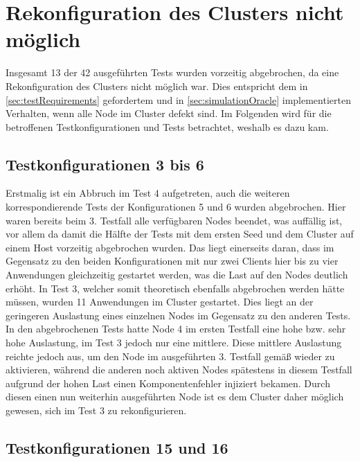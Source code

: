 \section{Rekonfiguration des Clusters nicht möglich}
\label{sec:noReconfig}

Insgesamt 13 der 42 ausgeführten Tests wurden vorzeitig abgebrochen, da eine Rekonfiguration des Clusters nicht möglich war.
Dies entspricht dem in \autoref{sec:testRequirements} gefordertem und in \autoref{sec:simulationOracle} implementierten Verhalten, wenn alle Node im Cluster defekt sind.
Im Folgenden wird für die betroffenen Testkonfigurationen und Tests betrachtet, weshalb es dazu kam.

\subsection{Testkonfigurationen 3 bis 6}
\label{sec:noReconf36}

Erstmalig ist ein Abbruch im Test 4 aufgetreten, auch die weiteren korrespondierende Tests der Konfigurationen 5 und 6 wurden abgebrochen.
Hier waren bereits beim 3. Testfall alle verfügbaren Nodes beendet, was auffällig ist, vor allem da damit die Hälfte der Tests mit dem ersten Seed und dem Cluster auf einem Host vorzeitig abgebrochen wurden.
Das liegt einerseits daran, dass im Gegensatz zu den beiden Konfigurationen mit nur zwei Clients hier bis zu vier Anwendungen gleichzeitig gestartet werden, was die Last auf den Nodes deutlich erhöht.
In Test 3, welcher somit theoretisch ebenfalls abgebrochen werden hätte müssen, wurden 11 Anwendungen im Cluster gestartet.
Dies liegt an der geringeren Auslastung eines einzelnen Nodes im Gegensatz zu den anderen Tests.
In den abgebrochenen Tests hatte Node 4 im ersten Testfall eine hohe bzw. sehr hohe Auslastung, im Test 3 jedoch nur eine mittlere.
Diese mittlere Auslastung reichte jedoch aus, um den Node im ausgeführten 3. Testfall gemäß  wieder zu aktivieren, während die anderen noch aktiven Nodes spätestens in diesem Testfall aufgrund der hohen Last einen Komponentenfehler injiziert bekamen.
Durch diesen einen nun weiterhin ausgeführten Node ist es dem Cluster daher möglich gewesen, sich im Test 3 zu rekonfigurieren.

\subsection{Testkonfigurationen 15 und 16}
\label{sec:noReconf1516}

